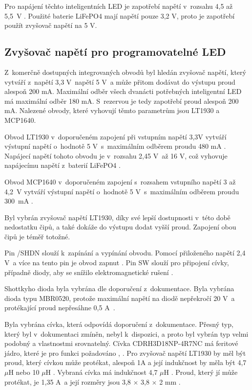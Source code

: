 Pro napájení těchto inteligentních LED je zapotřebí napětí v~rozsahu 4,5 až 5,5~V \cite{WS2812C_dtsh}. 
Použité baterie LiFePO4 mají napětí pouze 3,2 V, proto je zapotřebí použít zvyšovač napětí na 5 V. 

\subsection{Zvyšovač napětí pro programovatelné LED}
Z~komerčně dostupných integrovaných obvodů byl hledán zvyšovač napětí, který vytváří z~napětí 3,3 V~napětí 5 V~a může přitom dodávat do výstupu proud alespoň 200 mA. 
Maximální odběr všech dvanácti potřebných inteligentní LED má maximální odběr 180 mA. S~rezervou je tedy zapotřebí proud alespoň 200 mA. Nalezené obvody, které vyhovují 
těmto parametrům jsou LT1930 a MCP1640. 

Obvod LT1930 v~doporučeném zapojení při vstupním napětí 3,3V vytváří výstupní napětí o~hodnotě 5 V~s~maximálním odběrem proudu 480 mA \cite{LT1930_dtsh}. Napájecí napětí 
tohoto obvodu je v~rozsahu 2,45 V~až 16 V, což vyhovuje napájecímu napětí z~baterií LiFePO4 \cite{LT1930_dtsh}.

Obvod MCP1640 v~doporučeném zapojení s~rozsahem vstupního napětí 3 až 4,2~V vytváří výstupní napětí o~hodnotě 5 V~s~maximálním odběrem proudu 300~mA \cite{MCP1640_dtsh}.

Byl vybrán zvyšovač napětí LT1930, díky své lepší dostupnosti v~této době nedostatku čipů, a také dokáže do výstupu dodat vyšší proud. Zapojení obou čipů je téměř totožné. 

Pin /SHDN slouží k~zapínání a vypínání obvodu. Pomocí přiloženého napětí 2,4 V~a více na tento pin je obvod zapnut \cite{LT1930_dtsh}. Pin SW slouží pro  připojení cívky, 
případně diody, aby se snížilo elektromagnetické rušení \cite{LT1930_dtsh}. 

Shottkyho dioda byla vybrána dle doporučení z~dokumentace. Byla vybrána dioda typu MBR0520, protože maximální napětí na diodě nepřekročí 20 V~a protékající proud nepřesáhne 
0,5 A~\cite{LT1930_dtsh}.

Byla vybrána cívka, která odpovídá doporučení z~dokumentace. Přesný typ, který byl v~dokumentaci zmíněn, nebyl k~dispozici, a proto byl vybrán typ velmi podobný a vlastnostmi 
srovnatelný. Cívka CDRH3D18NP-4R7NC má feritové jádro, které je pro funkci požadováno \cite{LT1930_dtsh}, \cite{civka_dtsh}. Pro zvyšovač napětí LT1930 by měl být proud, který cívkou může protékat, 
alespoň 1A a její indukčnost by měla být 4,7 $\mu$H nebo 10 $\mu$H \cite{LT1930_dtsh}. Vybraná cívka má indukčnost 4,7 $\mu$H \cite{civka_dtsh}. Proud, který jí může protékat, je 1,35 A~a její rozměry 
jsou 3,8 $\times$ 3,8 $\times$ 2 mm \cite{civka_dtsh}.

